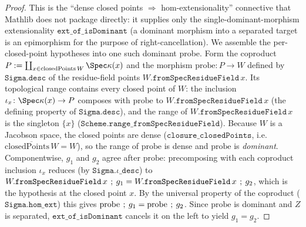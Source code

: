 \begin{proof}
\leanok
  This is the ``dense closed points \(\Rightarrow\) hom-extensionality'' connective that Mathlib does
  not package directly: it supplies only the single-dominant-morphism extensionality
  \(\mathtt{ext\_of\_isDominant}\) (a dominant morphism into a separated target is an epimorphism for
  the purpose of right-cancellation). We assemble the per-closed-point hypotheses into one such
  dominant probe.
  Form the coproduct \(P := \coprod_{x \in \mathrm{closedPoints}\,W} \Spec \kappa(x)\) and the morphism
  \(\mathrm{probe} \colon P \to W\) defined by \(\mathtt{Sigma.desc}\) of the residue-field points
  \(W.\mathtt{fromSpecResidueField}\,x\). Its topological range contains every closed point of \(W\):
  the inclusion \(\iota_x \colon \Spec \kappa(x) \to P\) composes with \(\mathrm{probe}\) to
  \(W.\mathtt{fromSpecResidueField}\,x\) (the defining property of \(\mathtt{Sigma.desc}\)), and the
  range of \(W.\mathtt{fromSpecResidueField}\,x\) is the singleton \(\{x\}\)
  (\(\mathtt{Scheme.range\_fromSpecResidueField}\)). Because \(W\) is a Jacobson space, the closed points
  are dense (\(\mathtt{closure\_closedPoints}\), i.e.\ \(\overline{\mathrm{closedPoints}\,W} = W\)), so
  the range of \(\mathrm{probe}\) is dense and \(\mathrm{probe}\) is \emph{dominant}.
  Componentwise, \(g_1\) and \(g_2\) agree after \(\mathrm{probe}\): precomposing with each coproduct
  inclusion \(\iota_x\) reduces (by \(\mathtt{Sigma.\iota\_desc}\)) to
  \(W.\mathtt{fromSpecResidueField}\,x \fatsemi g_1 = W.\mathtt{fromSpecResidueField}\,x \fatsemi g_2\),
  which is the hypothesis at the closed point \(x\). By the universal property of the coproduct
  (\(\mathtt{Sigma.hom\_ext}\)) this gives \(\mathrm{probe} \fatsemi g_1 = \mathrm{probe} \fatsemi g_2\).
  Since \(\mathrm{probe}\) is dominant and \(Z\) is separated, \(\mathtt{ext\_of\_isDominant}\) cancels it
  on the left to yield \(g_1 = g_2\).
\end{proof}
